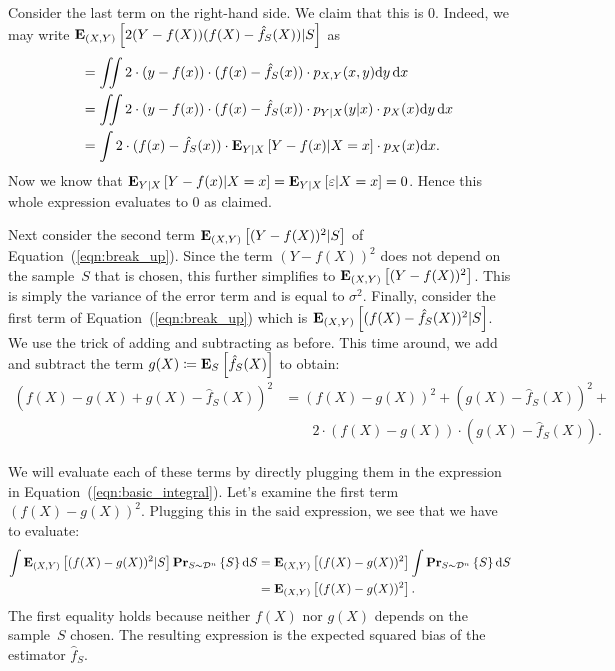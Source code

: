 Consider the last term on the right-hand side. We claim that this is $0$. Indeed,
we may write $\mathbf{E}_{(X, Y)} \left [ 2 (Y - f(X)) (f(X) - \hat{f}_S(X)) \vert S \right ]$ as
\begin{align*}
    \quad
    & = \iint 2 \cdot (y - f(x)) \cdot (f(x) - \hat{f}_S(x)) \cdot p_{X, Y}(x, y) \text{d} y \, \text{d} x \\
    & = \iint 2 \cdot (y - f(x)) \cdot (f(x) - \hat{f}_S(x)) \cdot p_{Y \vert X}(y \vert x) \cdot p_X(x) \text{d} y \, \text{d} x \\
    & = \int  2 \cdot (f(x) - \hat{f}_S(x)) \cdot \mathbf{E}_{Y \vert X} \left [ Y - f(x) \vert X = x \right ] \cdot p_X(x) \text{d} x.
\end{align*}
Now we know that
$\mathbf{E}_{Y \vert X} \left [ Y - f(x) \vert X = x \right ] = \mathbf{E}_{Y \vert X} \left [ \varepsilon \vert X = x \right ] = 0$. Hence this
whole expression evaluates to $0$ as claimed.

Next consider the second term $\mathbf{E}_{(X, Y)} \left [ (Y - f(X))^2 \vert S \right ]$ of
Equation~(\ref{eqn:break_up}). Since the term $(Y - f(X))^2$ does not depend
on the sample~$S$ that is chosen, this further simplifies to
$\mathbf{E}_{(X, Y)} \left [ (Y - f(X))^2 \right ]$. This is simply the variance of the error term
and is equal to $\sigma^2$. Finally, consider the first term of
Equation~(\ref{eqn:break_up}) which is $\mathbf{E}_{(X, Y)} \left [ (f(X) - \hat{f}_S(X))^2 \vert S \right ]$.
We use the trick of adding and subtracting as before. This time around, we add and
subtract the term $g(X) \coloneqq \mathbf{E}_{S} \left [ \hat{f}_S(X) \right ]$ to obtain:
\begin{equation}
\begin{split}
    (f(X) - g(X) + g(X) - \hat{f}_S(X))^2 & = (f(X) - g(X))^2 + (g(X) - \hat{f}_S(X))^2 + \\
            & \quad \quad 2 \cdot (f(X) - g(X)) \cdot (g(X) - \hat{f}_S(X)).
\end{split}
\end{equation}

We will evaluate each of these terms by directly plugging them in the expression
in Equation~(\ref{eqn:basic_integral}). Let's examine the first term $(f(X) - g(X))^2$.
Plugging this in the said expression, we see that we have to evaluate:
\begin{align}
    \int  \mathbf{E}_{(X, Y)} \left [ (f(X) - g(X))^2 \vert S \right ] \mathbf{Pr}_{S \sim \mathcal{D}^n} \left \{ S \right \} \text{d} S
     & =  \mathbf{E}_{(X, Y)} \left [ (f(X) - g(X))^2 \right ] \int    \mathbf{Pr}_{S \sim \mathcal{D}^n} \left \{ S \right \} \text{d} S \nonumber \\
     & =  \mathbf{E}_{(X, Y)} \left [ (f(X) - g(X))^2 \right ].
\end{align}
The first equality holds because neither $f(X)$ nor $g(X)$ depends on the sample~$S$
chosen. The resulting expression is the expected squared bias of the estimator
$\hat{f}_S$.

